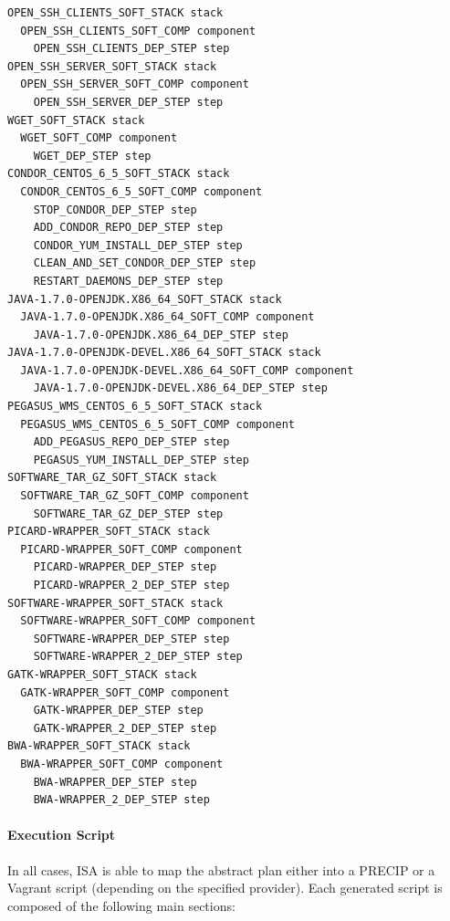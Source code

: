 \begin{lstlisting}[caption={Abstract deployment plan of the SoyKB WF.}, label={lst:plan-soykb}]
OPEN_SSH_CLIENTS_SOFT_STACK stack
  OPEN_SSH_CLIENTS_SOFT_COMP component
    OPEN_SSH_CLIENTS_DEP_STEP step
OPEN_SSH_SERVER_SOFT_STACK stack
  OPEN_SSH_SERVER_SOFT_COMP component
    OPEN_SSH_SERVER_DEP_STEP step
WGET_SOFT_STACK stack
  WGET_SOFT_COMP component
    WGET_DEP_STEP step
CONDOR_CENTOS_6_5_SOFT_STACK stack
  CONDOR_CENTOS_6_5_SOFT_COMP component
    STOP_CONDOR_DEP_STEP step
    ADD_CONDOR_REPO_DEP_STEP step
    CONDOR_YUM_INSTALL_DEP_STEP step
    CLEAN_AND_SET_CONDOR_DEP_STEP step
    RESTART_DAEMONS_DEP_STEP step
JAVA-1.7.0-OPENJDK.X86_64_SOFT_STACK stack
  JAVA-1.7.0-OPENJDK.X86_64_SOFT_COMP component
    JAVA-1.7.0-OPENJDK.X86_64_DEP_STEP step
JAVA-1.7.0-OPENJDK-DEVEL.X86_64_SOFT_STACK stack
  JAVA-1.7.0-OPENJDK-DEVEL.X86_64_SOFT_COMP component
    JAVA-1.7.0-OPENJDK-DEVEL.X86_64_DEP_STEP step
PEGASUS_WMS_CENTOS_6_5_SOFT_STACK stack
  PEGASUS_WMS_CENTOS_6_5_SOFT_COMP component
    ADD_PEGASUS_REPO_DEP_STEP step
    PEGASUS_YUM_INSTALL_DEP_STEP step
SOFTWARE_TAR_GZ_SOFT_STACK stack
  SOFTWARE_TAR_GZ_SOFT_COMP component
    SOFTWARE_TAR_GZ_DEP_STEP step
PICARD-WRAPPER_SOFT_STACK stack
  PICARD-WRAPPER_SOFT_COMP component
    PICARD-WRAPPER_DEP_STEP step
    PICARD-WRAPPER_2_DEP_STEP step
SOFTWARE-WRAPPER_SOFT_STACK stack
  SOFTWARE-WRAPPER_SOFT_COMP component
    SOFTWARE-WRAPPER_DEP_STEP step
    SOFTWARE-WRAPPER_2_DEP_STEP step
GATK-WRAPPER_SOFT_STACK stack
  GATK-WRAPPER_SOFT_COMP component
    GATK-WRAPPER_DEP_STEP step
    GATK-WRAPPER_2_DEP_STEP step
BWA-WRAPPER_SOFT_STACK stack
  BWA-WRAPPER_SOFT_COMP component
    BWA-WRAPPER_DEP_STEP step
    BWA-WRAPPER_2_DEP_STEP step
\end{lstlisting}


\paragraph{\textbf{Execution Script}}
In all cases, ISA is able to map the abstract plan either into a PRECIP or 
a Vagrant script (depending on the specified provider). Each generated script 
is composed of the following main sections:

